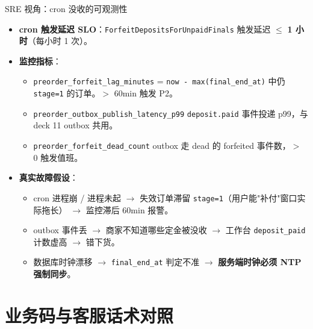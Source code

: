 \documentclass[aspectratio=169,11pt]{beamer}
\begin{document}
\begin{frame}[shrink]{SRE 视角：cron 没收的可观测性}
\begin{itemize}\small
  \item \textbf{cron 触发延迟 SLO}：\texttt{ForfeitDepositsForUnpaidFinals} 触发延迟 $\leq$ \textbf{1 小时}（每小时 1 次）。
  \item \textbf{监控指标}：
    \begin{itemize}\footnotesize
      \item \texttt{preorder\_forfeit\_lag\_minutes} = \texttt{now - max(final\_end\_at)} 中仍 \texttt{stage=1} 的订单。$>$ 60min 触发 P2。
      \item \texttt{preorder\_outbox\_publish\_latency\_p99} \texttt{deposit.paid} 事件投递 p99，与 deck 11 outbox 共用。
      \item \texttt{preorder\_forfeit\_dead\_count} outbox 走 dead 的 forfeited 事件数，$>$ 0 触发值班。
    \end{itemize}
  \item \textbf{真实故障假设}：
    \begin{itemize}\footnotesize
      \item cron 进程崩 / 进程未起 $\to$ 失效订单滞留 \texttt{stage=1}（用户能"补付"窗口实际拖长） $\to$ 监控滞后 60min 报警。
      \item outbox 事件丢 $\to$ 商家不知道哪些定金被没收 $\to$ 工作台 \texttt{deposit\_paid} 计数虚高 $\to$ 错下货。
      \item 数据库时钟漂移 $\to$ \texttt{final\_end\_at} 判定不准 $\to$ \textbf{服务端时钟必须 NTP 强制同步}。
    \end{itemize}
\end{itemize}
\end{frame}

\section{业务码与客服话术对照}
\end{document}
